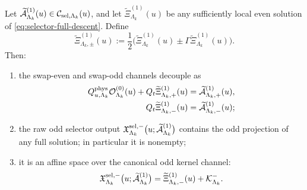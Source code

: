 \documentclass[11pt]{article}
\begin{document}
\begin{theorem}
\label{thm:selector-decomposition}
Let
\(
\widetilde{\mathcal A}^{(1)}_{\Lambda_k}(u)\in\mathcal C_{{\rm sel},\Lambda_k}(u)
\),
and let
\(
\widetilde{\Xi}^{(1)}_{\Lambda_k}(u)
\)
be any sufficiently local even solution of \eqref{eq:selector-full-descent}.
Define
\[
\widetilde{\Xi}^{(1)}_{\Lambda_k,\pm}(u)
:=
\frac12\Big(
\widetilde{\Xi}^{(1)}_{\Lambda_k}(u)
\pm
\Gamma\widetilde{\Xi}^{(1)}_{\Lambda_k}(u)
\Big).
\]
Then:
\begin{enumerate}[leftmargin=2em]
\item the swap-even and swap-odd channels decouple as
  \begin{align}
  Q^{\rm phys}_{u,\Lambda_k}\mathcal O^{(0)}_{\Lambda_k}(u)
  +
  Q_t\widetilde{\Xi}^{(1)}_{\Lambda_k,+}(u)
  &=
  \widetilde{\mathcal A}^{(1)}_{\Lambda_k,+}(u),
  \label{eq:selector-even-channel}
  \\
  Q_t\widetilde{\Xi}^{(1)}_{\Lambda_k,-}(u)
  &=
  \widetilde{\mathcal A}^{(1)}_{\Lambda_k,-}(u);
  \label{eq:selector-odd-channel}
  \end{align}
\item the raw odd selector output
  \(
  \mathfrak X_{\Lambda_k}^{{\rm sel},-}
  \big(u;\widetilde{\mathcal A}^{(1)}_{\Lambda_k}\big)
  \)
  contains the odd projection of any full solution; in particular it is nonempty;
\item it is an affine space over the canonical odd kernel channel:
  \[
  \mathfrak X_{\Lambda_k}^{{\rm sel},-}
  \big(u;\widetilde{\mathcal A}^{(1)}_{\Lambda_k}\big)
  =
  \widetilde{\Xi}^{(1)}_{\Lambda_k,-}(u)
  +
  \mathcal K^-_{\Lambda_k}.
  \]
\end{enumerate}
\end{theorem}
\end{document}
